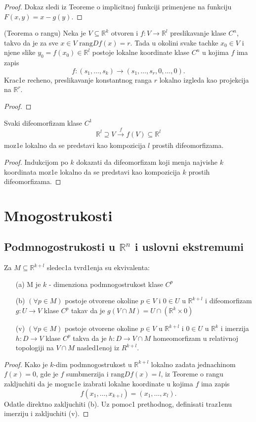 \documentclass[a4paper,12pt]{article}
\newcommand{\R}{\mathbb{R}}
\newcommand{\psj}{\subseteq}
\newcommand{\rang}{\mathrm{rang}}
\begin{document}
\begin{proof}
Dokaz sledi iz Teoreme o implicitnoj funkciji primenjene na funkciju $F(x,y) = x - g(y)$.
\end{proof}
\begin{tma}(Teorema o rangu) Neka je $V \subseteq \R^k$ otvoren i $f: V \to \R^l$ preslikavanje klase $C^n$, takvo da je za sve $x \in V$ $\rang Df(x) = r$. Tada u okolini svake tachke $x_0 \in V$ i njene slike $y_0 = f(x_0) \in \R^l$ postoje lokalne koordinate klase $C^n$ u kojima $f$ ima zapis \[f: (s_1, \dots , s_k) \to (s_1, \dots, s_r, 0, \dots , 0).\]
Krac1e recheno, preslikavanje konstantnog ranga $r$ lokalno izgleda kao projekcija na $\R^r$.
\end{tma}
\begin{proof}

\end{proof}
\begin{tvr}
Svaki difeomorfizam klase $C^1$ 
\[\R^l \supseteq V \xrightarrow[]{f} f(V) \subseteq \R^l \]
moz1e lokalno da se predstavi kao kompozicija $l$ prostih difeomorfizama. 
\end{tvr}
\begin{proof}
Indukcijom po $k$ dokazati da difeomorfizam koji menja najvishe $k$ koordinata moz1e lokalno da se predstavi kao kompozicija $k$ prostih difeomorfizama.
\end{proof}

\section{Mnogostrukosti}

\subsection{Podmnogostrukosti u $\R^n$ i uslovni ekstremumi}

\begin{tvr}
Za $M \psj \R^{k+l}$ sledec1a tvrd1enja su ekvivalenta:
\begin{itemize}
\item[(a)] M je $k$ - dimenziona podmnogostrukost klase $C^p$
\item[(b)] $(\forall p \in M)$ postoje otvorene okoline $p \in V$ i $0 \in U$ u $\R^{k+l}$ i difeomorfizam $g: U \to V$ klase $C^p$ takav da je $g(V \cap M) = U \cap (\R^k \times {0})$
\item[(v)] $(\forall p \in M)$ postoje otvorene okoline $p \in V$  u $\R^{k+l}$ i $0 \in U$ u $\R^k$ i imerzija $h: D \to V$ klase $C^p$ takva da je $h: D \to V \cap M$ homeomorfizam u relativnoj topologiji na $V \cap M$ nasled1enoj iz $R^{k+l}$.
\end{itemize}
\end{tvr}
\begin{proof}
Kako je $k$-dim podmnogostrukost u $\R^{k+l}$ lokalno zadata jednachinom $f(x) = 0$, gde je $f$ sumbmerzija i $\rang Df(x) = l$, iz Teoreme o rangu zakljuchiti da je moguc1e izabrati lokalne koordinate u kojima $f$ ima zapis 
\[ f(x_1, \dots , x_{k+l}) = (x_1, \dots, x_l). \] Odatle direktno zakljuchiti (b). Uz pomoc1 prethodnog, definisati traz1enu imerziju i zakljuchiti (v).
\end{proof}
\end{document}
